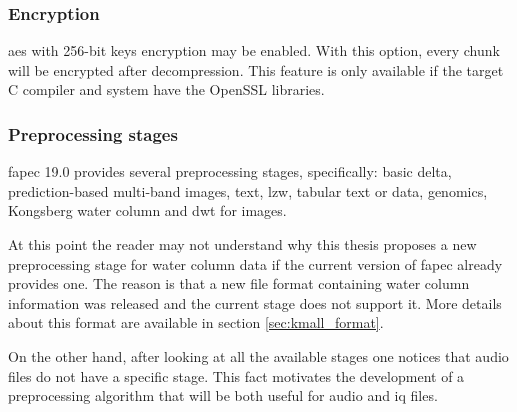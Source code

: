 \subsubsection{Encryption}
\acrshort{aes} with 256-bit keys encryption may be enabled. With this option, every chunk will be encrypted after decompression. This feature is only available if the target C compiler and system have the OpenSSL libraries.

\subsubsection{Preprocessing stages}
\acrshort{fapec} 19.0 provides several preprocessing stages, specifically: basic delta, prediction-based multi-band images, text, \acrshort{lzw}, tabular text or data, genomics, Kongsberg water column and \acrshort{dwt} for images.

At this point the reader may not understand why this thesis proposes a new preprocessing stage for water column data if the current version of \acrshort{fapec} already provides one. The reason is that a new file format containing water column information was released and the current stage does not support it. More details about this format are available in section \ref{sec:kmall_format}.

On the other hand, after looking at all the available stages one notices that audio files do not have a specific stage. This fact motivates the development of a preprocessing algorithm that will be both useful for audio and \acrshort{iq} files.
